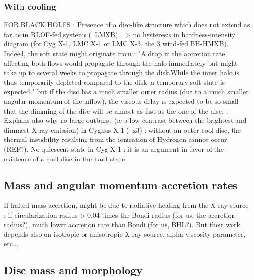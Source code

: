 \documentclass[a4paper,fleqn,usenatbib]{mnras}
\begin{document}
\subsubsection{With cooling}
\label{sec:cool_T}

FOR BLACK HOLES :
Presence of a disc-like structure which does not extend as far as in RLOF-fed systems (~LMXB) => no hysteresis in hardness-intensity diagram (for Cyg X-1, LMC X-1 or LMC X-3, the 3 wind-fed BH-HMXB). Indeed, the soft state might originate from : "A drop in the accretion rate affecting both flows would propagate through the halo immediately but might take up to several weeks to propagate through the disk.While the inner halo is thus temporarily depleted compared to the disk, a temporary soft state is expected." but if the disc has a much smaller outer radius (due to a much smaller angular momentum of the inflow), the viscous delay is expected to be so small that the dimming of the disc will be almost as fast as the one of the disc. \citep{Smith2002}. Explains also why no large outburst (ie a low contrast between the brightest and dimmest X-ray emission) in Cygnus X-1 (~x3) \citep{Grinberg:2014ux} : without an outer cool disc, the thermal instability resulting from the ionization of Hydrogen cannot occur (REF?). No quiescent state in Cyg X-1 : it is an argument in favor of the existence of a cool disc in the hard state.

\subsection{Mass and angular momentum accretion rates}
\label{sec:mdot_ldot}

If halted mass accretion, might be due to radiative heating from the X-ray source \citep{Sugimura2018} : if circularization radius > 0.04 times the Bondi radius (for us, the accretion radius?), much lower accretion rate than Bondi (for us, BHL?). But their work depends also on isotropic or anisotropic X-ray source, alpha viscosity parameter, etc...

\subsection{Disc mass and morphology}
\label{sec:disc}

\end{document}
